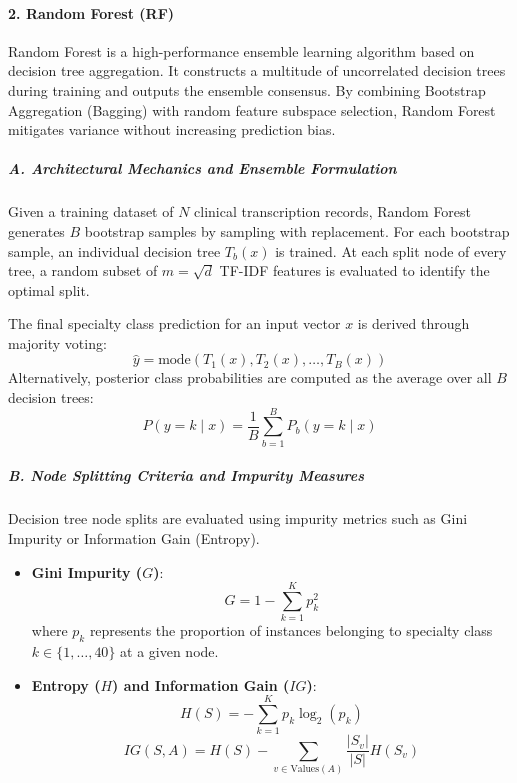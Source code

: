 \paragraph{2. Random Forest (RF)}

Random Forest is a high-performance ensemble learning algorithm based on decision tree aggregation. It constructs a multitude of uncorrelated decision trees during training and outputs the ensemble consensus. By combining Bootstrap Aggregation (Bagging) with random feature subspace selection, Random Forest mitigates variance without increasing prediction bias.

\subparagraph{A. Architectural Mechanics and Ensemble Formulation}
Given a training dataset of $N$ clinical transcription records, Random Forest generates $B$ bootstrap samples by sampling with replacement. For each bootstrap sample, an individual decision tree $T_b(x)$ is trained. At each split node of every tree, a random subset of $m = \sqrt{d}$ TF-IDF features is evaluated to identify the optimal split.

The final specialty class prediction for an input vector $x$ is derived through majority voting:
\begin{equation}
\hat{y} = \text{mode}(T_1(x), T_2(x), \dots, T_B(x))
\end{equation}
Alternatively, posterior class probabilities are computed as the average over all $B$ decision trees:
\begin{equation}
P(y = k \mid x) = \frac{1}{B} \sum_{b=1}^{B} P_b(y = k \mid x)
\end{equation}

\subparagraph{B. Node Splitting Criteria and Impurity Measures}
Decision tree node splits are evaluated using impurity metrics such as Gini Impurity or Information Gain (Entropy).
\begin{itemize}
    \item \textbf{Gini Impurity ($G$)}:
    \begin{equation}
    G = 1 - \sum_{k=1}^{K} p_k^2
    \end{equation}
    where $p_k$ represents the proportion of instances belonging to specialty class $k \in \{1, \dots, 40\}$ at a given node.
    \item \textbf{Entropy ($H$) and Information Gain ($IG$)}:
    \begin{equation}
    H(S) = -\sum_{k=1}^{K} p_k \log_2(p_k)
    \end{equation}
    \begin{equation}
    IG(S, A) = H(S) - \sum_{v \in \text{Values}(A)} \frac{|S_v|}{|S|} H(S_v)
    \end{equation}
\end{itemize}


